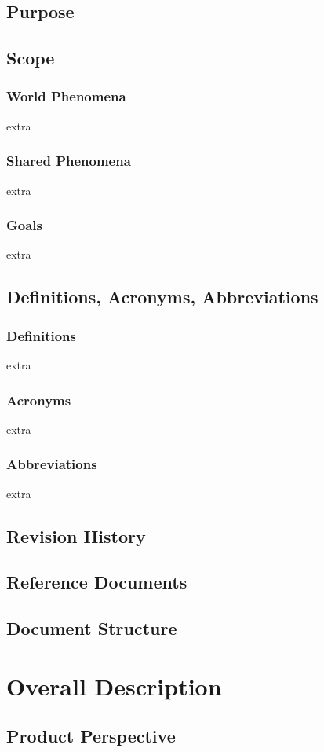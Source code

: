 \documentclass{article}
\begin{document}
	\subsection{Purpose}
	\subsection{Scope}
		\subsubsection{World Phenomena}
		extra
		\subsubsection{Shared Phenomena}
		extra
		\subsubsection{Goals}
		extra
	\subsection{Definitions, Acronyms, Abbreviations}
		\subsubsection{Definitions}
		extra
		\subsubsection{Acronyms}
		extra
		\subsubsection{Abbreviations}
		extra
	\subsection{Revision History}
	\subsection{Reference Documents}
	\subsection{Document Structure}
	

\section{Overall Description}
	\subsection{Product Perspective}
\end{document}
